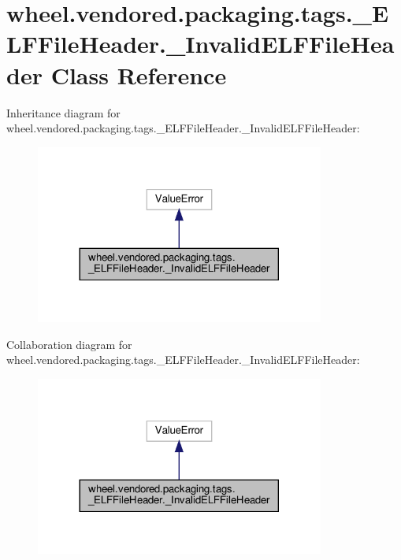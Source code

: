 \hypertarget{classwheel_1_1vendored_1_1packaging_1_1tags_1_1__ELFFileHeader_1_1__InvalidELFFileHeader}{}\section{wheel.\+vendored.\+packaging.\+tags.\+\_\+\+E\+L\+F\+File\+Header.\+\_\+\+Invalid\+E\+L\+F\+File\+Header Class Reference}
\label{classwheel_1_1vendored_1_1packaging_1_1tags_1_1__ELFFileHeader_1_1__InvalidELFFileHeader}


Inheritance diagram for wheel.\+vendored.\+packaging.\+tags.\+\_\+\+E\+L\+F\+File\+Header.\+\_\+\+Invalid\+E\+L\+F\+File\+Header\+:
\nopagebreak
\begin{figure}[H]
\begin{center}
\leavevmode
\includegraphics[width=269pt]{classwheel_1_1vendored_1_1packaging_1_1tags_1_1__ELFFileHeader_1_1__InvalidELFFileHeader__inherit__graph}
\end{center}
\end{figure}


Collaboration diagram for wheel.\+vendored.\+packaging.\+tags.\+\_\+\+E\+L\+F\+File\+Header.\+\_\+\+Invalid\+E\+L\+F\+File\+Header\+:
\nopagebreak
\begin{figure}[H]
\begin{center}
\leavevmode
\includegraphics[width=269pt]{classwheel_1_1vendored_1_1packaging_1_1tags_1_1__ELFFileHeader_1_1__InvalidELFFileHeader__coll__graph}
\end{center}
\end{figure}


